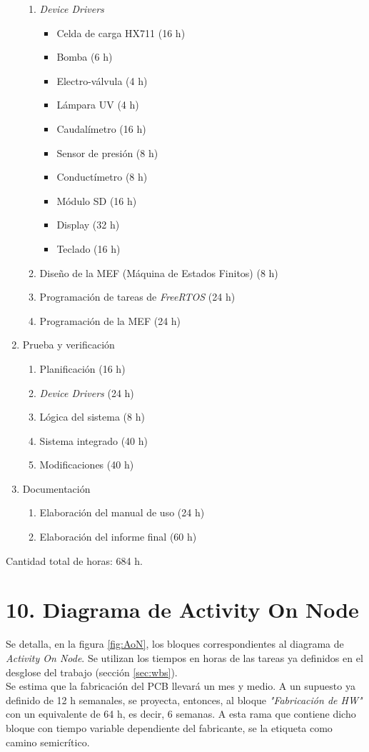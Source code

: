 \documentclass[
11pt, %
]{charter}
\begin{document}
\begin{enumerate}
	\begin{enumerate}
	\item \textit{Device Drivers}
		\begin{itemize}
			\item Celda de carga HX711 (16 h)
			\item Bomba (6 h)
			\item Electro-válvula (4 h)
			\item Lámpara UV (4 h)
			\item Caudalímetro (16 h)
			\item Sensor de presión (8 h)
			\item Conductímetro (8 h)
			\item Módulo SD (16 h)
			\item Display (32 h)
			\item Teclado (16 h)
		\end{itemize}
	\item Diseño de la MEF (Máquina de Estados Finitos) (8 h)
	\item Programación de tareas de \textit{FreeRTOS} (24 h)
	\item Programación de la MEF (24 h)
	\end{enumerate}
\item Prueba y verificación
	\begin{enumerate}
		\item Planificación (16 h)
		\item \textit{Device Drivers} (24 h)
		\item Lógica del sistema (8 h)
		\item Sistema integrado (40 h)
		\item Modificaciones (40 h)
	\end{enumerate}
\item Documentación
	\begin{enumerate}
		\item Elaboración del manual de uso (24 h)
		\item Elaboración del informe final (60 h)
	\end{enumerate}
\end{enumerate}

Cantidad total de horas: 684 h.

\section{10. Diagrama de Activity On Node}
\label{sec:AoN}

Se detalla, en la figura \ref{fig:AoN}, los bloques correspondientes al diagrama de \textit{Activity On Node}. Se utilizan los tiempos en horas de las tareas ya definidos en el desglose del trabajo (sección \ref{sec:wbs}).\\
Se estima que la fabricación del PCB llevará un mes y medio. A un supuesto ya definido de 12 h semanales, se proyecta, entonces, al bloque \textit{"Fabricación de HW"} con un equivalente de 64 h, es decir, 6 semanas. A esta rama que contiene dicho bloque con tiempo variable dependiente del fabricante, se la etiqueta como camino semicrítico.
\end{document}
